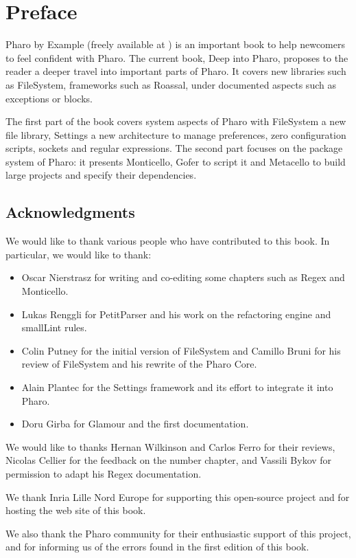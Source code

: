 \documentclass[a4paper,10pt,twoside]{book}
\begin{document}
	\sloppy
	\frontmatter
\fi
\chapter{Preface}

Pharo by Example (freely available at ) is an important book to help newcomers to feel confident with Pharo. 
The current book, Deep into Pharo, proposes to the reader a deeper travel into important parts of Pharo. It covers new libraries such as FileSystem, frameworks such as Roassal, under documented aspects such as exceptions or blocks. 

The first part of the book covers system aspects of Pharo with FileSystem a new file library, Settings a new architecture to manage preferences, zero configuration scripts, sockets and regular expressions. The second part focuses on the package system of Pharo: it presents Monticello, Gofer to script it and Metacello to build large projects and specify their dependencies. 

\section*{Acknowledgments}

We would like to thank various people who have contributed to this book. In particular, we would like to thank:
\begin{itemize}
\item Oscar Nierstrasz for writing and co-editing some chapters such as Regex and Monticello.
\item Lukas Renggli for PetitParser and his work on the refactoring engine and smallLint rules. 
\item Colin Putney for the initial version of FileSystem and Camillo Bruni for his review of FileSystem and his rewrite of the Pharo Core.
\item Alain Plantec for the Settings framework and its effort to integrate it into Pharo. 
\item Doru Girba for Glamour and the first documentation.
\end{itemize}

We would like to thanks Hernan Wilkinson and Carlos Ferro for their reviews, Nicolas Cellier for the feedback on the number chapter, and Vassili Bykov for permission to adapt his Regex documentation.

We thank Inria Lille Nord Europe for supporting this open-source project and for hosting the web site of this book.

We also thank the Pharo community for their enthusiastic support of this project, and for informing us of the errors found in the first edition of this book.



\ifx\wholebook\relax\else
   
   
\end{document}

